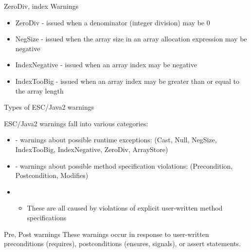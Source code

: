 \documentclass[
pdf,
nocolorBG,
slideColor,
cok,
]{prosper}
\begin{document}
\begin{slide}{ZeroDiv, index Warnings}
\vspace*{-6ex}

\begin{itemize}
\item {\knalblue ZeroDiv} - issued when a denominator (integer division) may be 0
\item {\knalblue NegSize} - issued when the array size in an array allocation expression may be negative
\item {\knalblue IndexNegative} - issued when an array index may be negative
\item {\knalblue IndexTooBig} - issued when an array index may be greater than or equal to the array length
\end{itemize}
{\tiny
\begin{figure*}

\end{figure*}
}
\end{slide}


\begin{slide}{Types of ESC/Java2 warnings}
\vspace*{-6ex}

ESC/Java2 warnings fall into various categories:
\begin{itemize}
\item[] - {\gray warnings about possible { runtime exceptions}:
(Cast, Null, NegSize, IndexTooBig, IndexNegative, ZeroDiv, ArrayStore)}

\item[] - warnings about possible method {\knalblue specification violations}:
(Precondition, Postcondition, Modifies)

\item[]
\begin{itemize}
\item These are all caused by violations of explicit user-written method specifications
\end{itemize}

\end{itemize}
\end{slide}
\begin{slide}{Pre, Post warnings}
\vspace*{-6ex}
These warnings occur in response to user-written preconditions (requires), postconditions (ensures, signals), or assert statements.


\begin{figure*}
\tiny

\end{figure*}
\end{slide}
\end{document}
